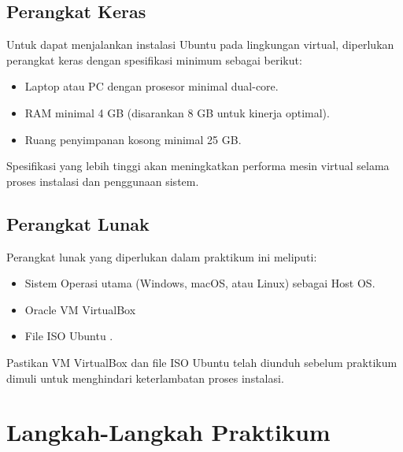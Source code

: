 \subsection{Perangkat Keras}
Untuk dapat menjalankan instalasi Ubuntu pada lingkungan virtual, diperlukan perangkat keras dengan spesifikasi minimum sebagai berikut:
\begin{itemize}
    \item Laptop atau PC dengan prosesor minimal dual-core.
    \item RAM minimal 4 GB (disarankan 8 GB untuk kinerja optimal).
    \item Ruang penyimpanan kosong minimal 25 GB.

\end{itemize}
Spesifikasi yang lebih tinggi akan meningkatkan performa mesin virtual selama proses instalasi dan penggunaan sistem.

\subsection{Perangkat Lunak}
Perangkat lunak yang diperlukan dalam praktikum ini meliputi:
\begin{itemize}
    \item Sistem Operasi utama (Windows, macOS, atau Linux) sebagai Host OS.
    \item Oracle VM VirtualBox 
    \item File ISO Ubuntu .
\end{itemize}
Pastikan VM VirtualBox dan file ISO Ubuntu telah diunduh sebelum praktikum dimuli untuk menghindari keterlambatan proses instalasi.

\newpage
\section{Langkah-Langkah Praktikum}

